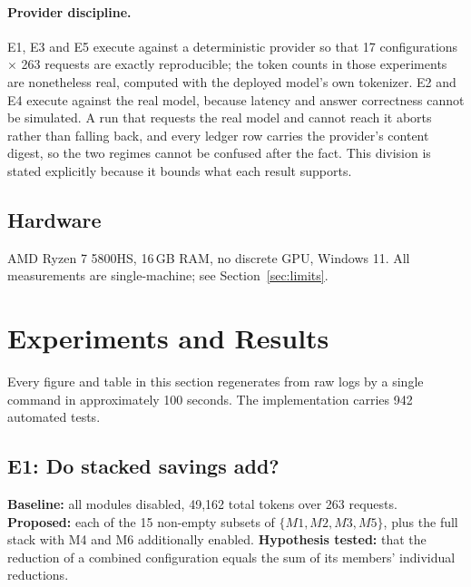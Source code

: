 \documentclass[11pt,a4paper]{article}
\begin{document}
\paragraph{Provider discipline.} E1, E3 and E5 execute against a deterministic
provider so that 17 configurations $\times$ 263 requests are exactly
reproducible; the token counts in those experiments are nonetheless real,
computed with the deployed model's own tokenizer. E2 and E4 execute against the
real model, because latency and answer correctness cannot be simulated. A run
that requests the real model and cannot reach it aborts rather than falling back,
and every ledger row carries the provider's content digest, so the two regimes
cannot be confused after the fact. This division is stated explicitly because it
bounds what each result supports.

\subsection{Hardware}
AMD Ryzen 7 5800HS, 16\,GB RAM, no discrete GPU, Windows 11. All measurements are
single-machine; see Section~\ref{sec:limits}.

\section{Experiments and Results}
\label{sec:results}

Every figure and table in this section regenerates from raw logs by a single
command in approximately 100 seconds. The implementation carries 942 automated
tests.

\subsection{E1: Do stacked savings add? }
\label{sec:e1}

\textbf{Baseline:} all modules disabled, 49{,}162 total tokens over 263 requests.
\textbf{Proposed:} each of the 15 non-empty subsets of $\{M1,M2,M3,M5\}$, plus
the full stack with M4 and M6 additionally enabled.
\textbf{Hypothesis tested:} that the reduction of a combined configuration equals
the sum of its members' individual reductions.
\end{document}
